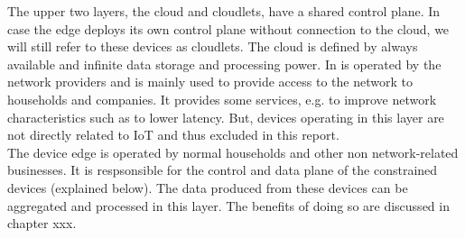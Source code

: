 The upper two layers, the cloud and cloudlets, have a shared control plane. In case the edge deploys its own control plane without connection to the cloud, we will still refer to these devices as cloudlets. The cloud is defined by always available and infinite data storage and processing power. In  is operated by the network providers and is mainly used to provide access to the network to households and companies. It provides some services, e.g. to improve network characteristics such as to lower latency. But, devices operating in this layer are not directly related to IoT and thus excluded in this report.\\
The device edge is operated by normal households and other non network-related businesses. It is respsonsible for the control and data plane of the constrained devices (explained below). The data produced from these devices can be aggregated and processed in this layer. The benefits of doing so are discussed in chapter xxx.

